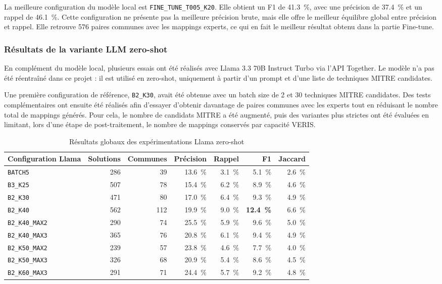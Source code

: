\documentclass[a4paper,12pt]{article}
\begin{document}
La meilleure configuration du modèle local est \texttt{FINE\_TUNE\_T005\_K20}. Elle obtient un F1 de 41.3~\%, avec une précision de 37.4~\% et un rappel de 46.1~\%. Cette configuration ne présente pas la meilleure précision brute, mais elle offre le meilleur équilibre global entre précision et rappel. Elle retrouve 576 paires communes avec les mappings experts, ce qui en fait le meilleur résultat obtenu dans la partie Fine-tune.

\subsubsection{Résultats de la variante LLM zero-shot}

En complément du modèle local, plusieurs essais ont été réalisés avec Llama 3.3 70B Instruct Turbo via l'API Together. Le modèle n'a pas été réentraîné dans ce projet : il est utilisé en zero-shot, uniquement à partir d'un prompt et d'une liste de techniques MITRE candidates.

Une première configuration de référence, \texttt{B2\_K30}, avait été obtenue avec un batch size de 2 et 30 techniques MITRE candidates. Des tests complémentaires ont ensuite été réalisés afin d'essayer d'obtenir davantage de paires communes avec les experts tout en réduisant le nombre total de mappings générés. Pour cela, le nombre de candidats MITRE a été augmenté, puis des variantes plus strictes ont été évaluées en limitant, lors d'une étape de post-traitement, le nombre de mappings conservés par capacité VERIS.

\begin{table}[H]
\centering
\small
\begin{tabular}{lrrrrrr}
\toprule
Configuration Llama & Solutions & Communes & Précision & Rappel & F1 & Jaccard \\
\midrule
\texttt{BATCH5} & 286 & 39 & 13.6~\% & 3.1~\% & 5.1~\% & 2.6~\% \\
\texttt{B3\_K25} & 507 & 78 & 15.4~\% & 6.2~\% & 8.9~\% & 4.6~\% \\
\texttt{B2\_K30} & 471 & 80 & 17.0~\% & 6.4~\% & 9.3~\% & 4.9~\% \\
\texttt{B2\_K40} & 562 & 112 & 19.9~\% & 9.0~\% & \textbf{12.4~\%} & 6.6~\% \\
\texttt{B2\_K40\_MAX2} & 290 & 74 & 25.5~\% & 5.9~\% & 9.6~\% & 5.0~\% \\
\texttt{B2\_K40\_MAX3} & 365 & 76 & 20.8~\% & 6.1~\% & 9.4~\% & 4.9~\% \\
\texttt{B2\_K50\_MAX2} & 239 & 57 & 23.8~\% & 4.6~\% & 7.7~\% & 4.0~\% \\
\texttt{B2\_K50\_MAX3} & 326 & 68 & 20.9~\% & 5.4~\% & 8.6~\% & 4.5~\% \\
\texttt{B2\_K60\_MAX3} & 291 & 71 & 24.4~\% & 5.7~\% & 9.2~\% & 4.8~\% \\
\bottomrule
\end{tabular}
\caption{Résultats globaux des expérimentations Llama zero-shot}
\label{tab:llama-zero-shot-results}
\end{table}
\end{document}
